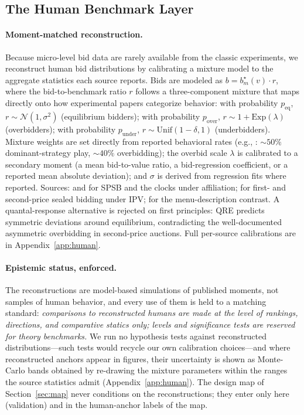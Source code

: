 \subsection{The Human Benchmark Layer}\label{sec:reconstruction}

\paragraph{Moment-matched reconstruction.}
Because micro-level bid data are rarely available from the classic experiments, we reconstruct human bid distributions by calibrating a mixture model to the aggregate statistics each source reports. Bids are modeled as $b = b^\star_m(v)\cdot r$, where the bid-to-benchmark ratio $r$ follows a three-component mixture that maps directly onto how experimental papers categorize behavior: with probability $p_{\text{eq}}$, $r \sim \mathcal{N}(1,\sigma^2)$ (equilibrium bidders); with probability $p_{\text{over}}$, $r \sim 1 + \mathrm{Exp}(\lambda)$ (overbidders); with probability $p_{\text{under}}$, $r \sim \mathrm{Unif}(1-\delta, 1)$ (underbidders). Mixture weights are set directly from reported behavioral rates (e.g., \citealp{li2017obviously}: ${\sim}50\%$ dominant-strategy play, ${\sim}40\%$ overbidding); the overbid scale $\lambda$ is calibrated to a secondary moment (a mean bid-to-value ratio, a bid-regression coefficient, or a reported mean absolute deviation); and $\sigma$ is derived from regression fits where reported. Sources: \citet{li2017obviously} and \citet{breitmoser2022obviousness} for SPSB and the clocks under affiliation; \citet{kagel1993independent} for first- and second-price sealed bidding under IPV; \citet{gonczarowski2023strategyproofness} for the menu-description contrast. A quantal-response alternative is rejected on first principles: QRE predicts symmetric deviations around equilibrium, contradicting the well-documented asymmetric overbidding in second-price auctions. Full per-source calibrations are in Appendix~\ref{app:human}.

\paragraph{Epistemic status, enforced.}
The reconstructions are model-based simulations of published moments, not samples of human behavior, and every use of them is held to a matching standard: \emph{comparisons to reconstructed humans are made at the level of rankings, directions, and comparative statics only; levels and significance tests are reserved for theory benchmarks.} We run no hypothesis tests against reconstructed distributions---such tests would recycle our own calibration choices---and where reconstructed anchors appear in figures, their uncertainty is shown as Monte-Carlo bands obtained by re-drawing the mixture parameters within the ranges the source statistics admit (Appendix~\ref{app:human}). The design map of Section~\ref{sec:map} never conditions on the reconstructions; they enter only here (validation) and in the human-anchor labels of the map.

